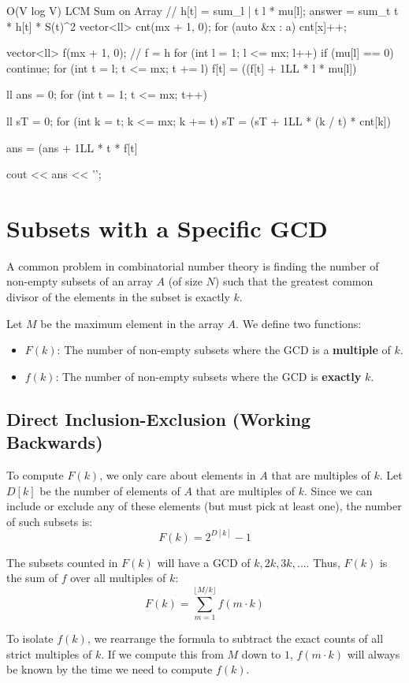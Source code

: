 \documentclass[11pt]{article}
\begin{document}
\begin{vscode}{O(V log V) LCM Sum on Array}
// h[t] = sum_{l | t} l * mu[l]; answer = sum_t t * h[t] * S(t)^2
vector<ll> cnt(mx + 1, 0);
for (auto &x : a)
    cnt[x]++;

vector<ll> f(mx + 1, 0); // f = h
for (int l = 1; l <= mx; l++)
{
    if (mu[l] == 0)
        continue;
    for (int t = l; t <= mx; t += l)
        f[t] = ((f[t] + 1LL * l * mu[l]) %
}

ll ans = 0;
for (int t = 1; t <= mx; t++)
{
    ll sT = 0;
    for (int k = t; k <= mx; k += t)
        sT = (sT + 1LL * (k / t) * cnt[k]) %

    ans = (ans + 1LL * t * f[t] %
}
cout << ans << '\n';
\end{vscode}

\pagebreak
\section{Subsets with a Specific GCD}
\label{sec:subsets_gcd}

A common problem in combinatorial number theory is finding the number of non-empty subsets of an array $A$ (of size $N$) such that the greatest common divisor of the elements in the subset is exactly $k$.

Let $M$ be the maximum element in the array $A$. We define two functions:
\begin{itemize}
    \item $F(k)$: The number of non-empty subsets where the GCD is a \textbf{multiple} of $k$.
    \item $f(k)$: The number of non-empty subsets where the GCD is \textbf{exactly} $k$.
\end{itemize}

\subsection{Direct Inclusion-Exclusion (Working Backwards)}

\begin{derivation}
    To compute $F(k)$, we only care about elements in $A$ that are multiples of $k$.
    Let $D[k]$ be the number of elements of $A$ that are multiples of $k$.
    Since we can include or exclude any of these elements (but must pick at least one), the number of such subsets is:
    \[ F(k) = 2^{D[k]} - 1 \]

    The subsets counted in $F(k)$ will have a GCD of $k, 2k, 3k, \dots$. Thus, $F(k)$ is the sum of $f$ over all multiples of $k$:
    \[ F(k) = \sum_{m=1}^{\lfloor M/k \rfloor} f(m \cdot k) \]

    To isolate $f(k)$, we rearrange the formula to subtract the exact counts of all strict multiples of $k$. If we compute this from $M$ down to $1$, $f(m \cdot k)$ will always be known by the time we need to compute $f(k)$.
\end{derivation}
\end{document}
